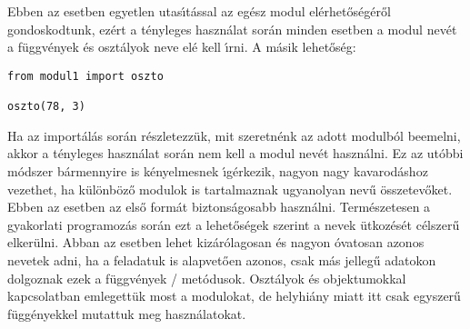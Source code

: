 Ebben az esetben egyetlen utas\'{\i}t\'assal az eg\'esz modul el\'erhet\H{o}s\'eg\'er\H{o}l gondoskodtunk, ez\'ert 
a t\'enyleges haszn\'alat sor\'an minden esetben a modul nev\'et a f\"uggv\'enyek \'es oszt\'alyok neve el\'e kell 
\'{\i}rni. A m\'asik lehet\H{o}s\'eg:

\begin{Verbatim}[fontsize=\small]
from modul1 import oszto

oszto(78, 3)
\end{Verbatim}

Ha az import\'al\'as sor\'an r\'eszletezz\"uk, mit szeretn\'enk az adott modulb\'ol beemelni, akkor a t\'enyleges 
haszn\'alat sor\'an nem kell a modul nev\'et haszn\'alni. Ez az ut\'obbi m\'odszer b\'armennyire is k\'enyelmesnek 
\'{\i}g\'erkezik, nagyon nagy kavarod\'ashoz vezethet, ha k\"ul\"onb\"oz\H{o} modulok is tartalmaznak ugyanolyan 
nev\H{u} \"osszetev\H{o}ket. Ebben az esetben az els\H{o} form\'at biztons\'agosabb haszn\'alni. Term\'eszetesen a 
gyakorlati programoz\'as sor\'an ezt a lehet\H{o}s\'egek szerint a nevek \"utkoz\'es\'et c\'elszer\H{u} elker\"ulni. 
Abban az esetben lehet kiz\'ar\'olagosan \'es nagyon \'ovatosan azonos nevetek adni, ha a feladatuk is alapvet\H{o}en 
azonos, csak m\'as jelleg\H{u} adatokon dolgoznak ezek a f\"uggv\'enyek / met\'odusok. Oszt\'alyok \'es 
objektumokkal kapcsolatban emlegett\"uk most a modulokat, de helyhi\'any miatt itt csak egyszer\H{u} f\"ugg\'enyekkel 
mutattuk meg haszn\'alatokat. 


